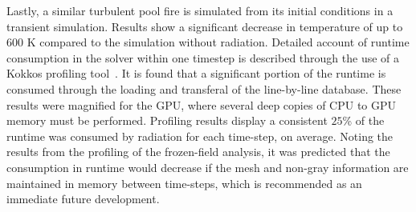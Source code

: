 Lastly, a similar turbulent pool fire is simulated from its initial conditions in a transient simulation.
Results show a significant decrease in temperature of up to $600$ K compared to the simulation without radiation.
Detailed account of runtime consumption in the solver within one timestep is described through the use of a Kokkos profiling tool~\cite{Trott_KokkosEcosystem2021}. It is found that a significant portion of the runtime is consumed through the loading and transferal of the line-by-line database. These results were magnified for the GPU, where several deep copies of CPU to GPU memory must be performed.
 Profiling results display a consistent $25$\% of the runtime was consumed by radiation for each time-step, on average. Noting the results from the profiling of the frozen-field analysis, it was predicted that the consumption in runtime would decrease if the mesh and non-gray information are maintained in memory between time-steps, which is recommended as an immediate future development.


